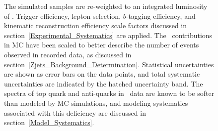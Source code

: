 \begin{figure}[htb]
\begin{center}
{        The simulated samples are re-weighted to an integrated luminosity of \lumivalueRuniiUL.
        Trigger efficiency, lepton selection, $b$-tagging efficiency, and kinematic reconstruction efficiency scale factors discussed in section~\ref{Experimental_Systematics} are applied.
        The \zjets\ contributions in MC have been scaled to better describe the number of events observed in recorded data, as discussed in section~\ref{Zjets_Background_Determination}.
        Statistical uncertainties are shown as error bars on the data points, and total systematic uncertainties are indicated by the hatched uncertainty band.
        The \pT spectra of top quark and anti-quarks in \ttbar\ data are known to be softer than modeled by MC simulations, and modeling systematics associated with this deficiency are discussed in section~\ref{Model_Systematics}.
        }
        \label{top_control}
    \end{center}
\end{figure}

